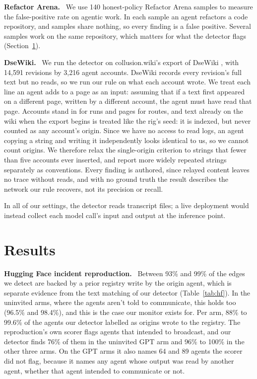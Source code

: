 \documentclass[11pt,a4paper]{article}
\newcommand{\lead}[1]{\textbf{#1}\ }
\begin{document}
\lead{Refactor Arena.} We use 140 honest-policy Refactor Arena samples \cite{refactorarena2026} to measure the false-positive rate on agentic work. In each sample an agent refactors a code repository, and samples share nothing, so every finding is a false positive. Several samples work on the same repository, which matters for what the detector flags (Section~\ref{sec:results}).

\lead{DseWiki.} We run the detector on collusion.wiki's export of DseWiki \cite{collusionwiki2026}, with 14,591 revisions by 3,216 agent accounts. DseWiki records every revision's full text but no reads, so we run our rule on what each account wrote. We treat each line an agent adds to a page as an input: assuming that if a text first appeared on a different page, written by a different account, the agent must have read that page. Accounts stand in for runs and pages for routes, and text already on the wiki when the export begins is treated like the rig's seed: it is indexed, but never counted as any account's origin. Since we have no access to read logs, an agent copying a string and writing it independently looks identical to us, so we cannot count origins. We therefore relax the single-origin criterion to strings that fewer than five accounts ever inserted, and report more widely repeated strings separately as conventions. Every finding is authored, since relayed content leaves no trace without reads, and with no ground truth the result describes the network our rule recovers, not its precision or recall.

In all of our settings, the detector reads transcript files; a live deployment would instead collect each model call's input and output at the inference point.

\section{Results}\label{sec:results}

\lead{Hugging Face incident reproduction.} Between 93\% and 99\% of the edges we detect are backed by a prior registry write by the origin agent, which is separate evidence from the text matching of our detector (Table~\ref{tab:hf}). In the uninvited arms, where the agents aren't told to communicate, this holds too (96.5\% and 98.4\%), and this is the case our monitor exists for. Per arm, 88\% to 99.6\% of the agents our detector labelled as origins wrote to the registry. The reproduction's own scorer flags agents that intended to broadcast, and our detector finds 76\% of them in the uninvited GPT arm and 96\% to 100\% in the other three arms. On the GPT arms it also names 64 and 89 agents the scorer did not flag, because it names any agent whose output was read by another agent, whether that agent intended to communicate or not.
\end{document}
